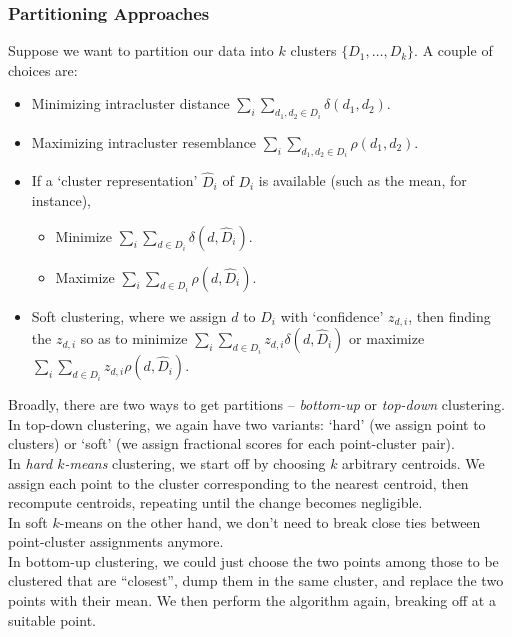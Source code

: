 \documentclass{article}
\begin{document}

		\subsubsection{Partitioning Approaches}

			Suppose we want to partition our data into $k$ clusters $\{D_1,\ldots,D_k\}$. A couple of choices are:
			\begin{itemize}
				\item Minimizing intracluster distance $\sum_i \sum_{d_1,d_2 \in D_i} \delta(d_1,d_2)$.
				\item Maximizing intracluster resemblance $\sum_i \sum_{d_1,d_2 \in D_i} \rho(d_1,d_2)$.
				\item If a `cluster representation' $\hat{D}_i$ of $D_i$ is available (such as the mean, for instance),
				\begin{itemize}
					\item Minimize $\sum_i \sum_{d \in D_i} \delta(d,\hat{D}_i)$.
					\item Maximize $\sum_i \sum_{d\in D_i} \rho(d,\hat{D}_i)$.
				\end{itemize}
				\item Soft clustering, where we assign $d$ to $D_i$ with `confidence' $z_{d,i}$, then finding the $z_{d,i}$ so as to minimize $\sum_{i} \sum_{d\in D_i} z_{d,i} \delta(d,\hat{D}_i)$ or maximize $\sum_i \sum_{d\in D_i} z_{d,i} \rho(d,\hat{D}_i)$.
			\end{itemize}

			Broadly, there are two ways to get partitions -- \emph{bottom-up} or \emph{top-down} clustering.\\

			In top-down clustering, we again have two variants: `hard' (we assign point to clusters) or `soft' (we assign fractional scores for each point-cluster pair).\\
			In \emph{hard $k$-means} clustering, we start off by choosing $k$ arbitrary centroids. We assign each point to the cluster corresponding to the nearest centroid, then recompute centroids, repeating until the change becomes negligible.\\
			In soft $k$-means on the other hand, we don't need to break close ties between point-cluster assignments anymore.\\

			In bottom-up clustering, we could just choose the two points among those to be clustered that are ``closest'', dump them in the same cluster, and replace the two points with their mean. We then perform the algorithm again, breaking off at a suitable point.\\
\end{document}
